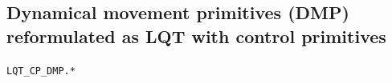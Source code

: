 \documentclass[10pt,a4paper]{article} %
\newcommand{\trsp}{{\scriptscriptstyle\top}}
\newcommand{\ty}[1]{{\scriptscriptstyle{#1}}}
\newcommand{\filename}[1]{\colorbox{rr2}{\color{white}\texttt{#1}}}
\begin{document}



\subsection{Dynamical movement primitives (DMP) reformulated as LQT with control primitives}\label{sec:DMPLQT}
\begin{flushright}
\filename{LQT\_CP\_DMP.*}
\end{flushright}
\end{document}
